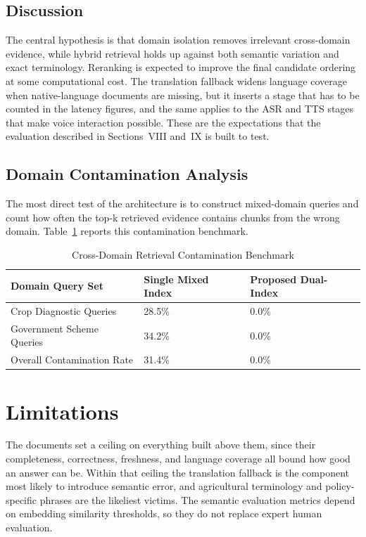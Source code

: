 \documentclass[10pt,twocolumn,letterpaper]{article}
\begin{document}
\subsection{Discussion}
The central hypothesis is that domain isolation removes irrelevant cross-domain evidence, while hybrid retrieval holds up against both semantic variation and exact terminology. Reranking is expected to improve the final candidate ordering at some computational cost. The translation fallback widens language coverage when native-language documents are missing, but it inserts a stage that has to be counted in the latency figures, and the same applies to the ASR and TTS stages that make voice interaction possible. These are the expectations that the evaluation described in Sections~VIII and~IX is built to test.

\subsection{Domain Contamination Analysis}
The most direct test of the architecture is to construct mixed-domain queries and count how often the top-k retrieved evidence contains chunks from the wrong domain. Table~\ref{tab:contam} reports this contamination benchmark.

\begin{table}[t]
\caption{Cross-Domain Retrieval Contamination Benchmark}
\label{tab:contam}
\centering
\footnotesize
\begin{tabular}{@{}p{3.1cm}p{2.1cm}p{2.1cm}@{}}
\toprule
\textbf{Domain Query Set} & \textbf{Single Mixed Index} & \textbf{Proposed Dual-Index} \\
\midrule
Crop Diagnostic Queries & 28.5\% & 0.0\% \\
Government Scheme Queries & 34.2\% & 0.0\% \\
Overall Contamination Rate & 31.4\% & 0.0\% \\
\bottomrule
\end{tabular}
\end{table}

\section{Limitations}
The documents set a ceiling on everything built above them, since their completeness, correctness, freshness, and language coverage all bound how good an answer can be. Within that ceiling the translation fallback is the component most likely to introduce semantic error, and agricultural terminology and policy-specific phrases are the likeliest victims. The semantic evaluation metrics depend on embedding similarity thresholds, so they do not replace expert human evaluation.
\end{document}
